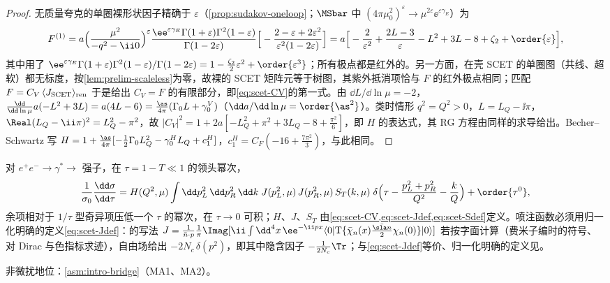 \begin{proof}
无质量夸克的单圈裸形状因子精确于 $\varepsilon$（\cref{prop:sudakov-oneloop}；$\MSbar$ 中 $(4\pi\mu_0^2)^\varepsilon\to\mu^{2\varepsilon}\ee^{\varepsilon\gamma_E}$）为
\[
F^{(1)}=a\Big(\frac{\mu^2}{-q^2-\ii0}\Big)^{\varepsilon}\frac{\ee^{\varepsilon\gamma_E}\Gamma(1+\varepsilon)\Gamma^2(1-\varepsilon)}{\Gamma(1-2\varepsilon)}\Big[-\frac{2-\varepsilon+2\varepsilon^2}{\varepsilon^2(1-2\varepsilon)}\Big]
=a\Big[-\frac{2}{\varepsilon^2}+\frac{2L-3}{\varepsilon}-L^2+3L-8+\zeta_2+\order{\varepsilon}\Big],
\]
其中用了 $\ee^{\varepsilon\gamma_E}\Gamma(1+\varepsilon)\Gamma^2(1-\varepsilon)/\Gamma(1-2\varepsilon)=1-\frac{\zeta_2}{2}\varepsilon^2+\order{\varepsilon^3}$；所有极点都是红外的。另一方面，在壳 SCET 的单圈图（共线、超软）都无标度，按\cref{lem:prelim-scaleless}为零，故裸的 SCET 矩阵元等于树图，其紫外抵消项恰与 $F$ 的红外极点相同；匹配 $F=C_V\,\langle J_{\rm SCET}\rangle_{\rm ren}$ 于是给出 $C_V=F$ 的有限部分，即\cref{eq:scet-CV}的第一式。由 $\dd L/\dd\ln\mu=-2$，$\frac{\dd}{\dd\ln\mu}a(-L^2+3L)=a(4L-6)=\frac{\as}{4\pi}(\Gamma_0L+\gamma^V_0)$（$\dd a/\dd\ln\mu=\order{\as^2}$）。类时情形 $q^2=Q^2>0$，$L=L_Q-\ii\pi$，$\Real(L_Q-\ii\pi)^2=L_Q^2-\pi^2$，故 $|C_V|^2=1+2a[-L_Q^2+\pi^2+3L_Q-8+\frac{\pi^2}{6}]$，即 $H$ 的表达式，其 RG 方程由同样的求导给出。Becher--Schwartz 写 $H=1+\frac{\as}{4\pi}[-\frac12\Gamma_0L_Q^2-\gamma^H_0L_Q+c^H_1]$，$c^H_1=C_F(-16+\frac{7\pi^2}{3})$，与此相同。
\end{proof}

\begin{theorem}\label{thm:scet-thrust}
对 $e^+e^-\to\gamma^*\to$ 强子，在 $\tau=1-T\ll1$ 的领头幂次，
\begin{equation}\label{eq:scet-thrust-fact}
\frac{1}{\sigma_0}\frac{\dd\sigma}{\dd\tau}=H(Q^2,\mu)\int\dd p_L^2\,\dd p_R^2\,\dd k\;J(p_L^2,\mu)\,J(p_R^2,\mu)\,S_T(k,\mu)\;
\delta\Big(\tau-\frac{p_L^2+p_R^2}{Q^2}-\frac kQ\Big)+\order{\tau^0},
\end{equation}
余项相对于 $1/\tau$ 型奇异项压低一个 $\tau$ 的幂次，在 $\tau\to0$ 可积；$H$、$J$、$S_T$ 由\cref{eq:scet-CV,eq:scet-Jdef,eq:scet-Sdef}定义。喷注函数必须用归一化明确的定义\cref{eq:scet-Jdef}：\cite[式~(2.6)]{BecherSchwartz2008}的写法 $J=\frac{1}{\bar n\cdot p}\frac1\pi\Imag[\ii\int\dd^4x\,\ee^{-\ii px}\langle0|\mathrm T\{\bar\chi_n(x)\frac{\bar{\sla n}}2\chi_n(0)\}|0\rangle]$ 若按字面计算（费米子编时的符号、对 Dirac 与色指标求迹），自由场给出 $-2N_c\,\delta(p^2)$，即其中隐含因子 $-\frac1{2N_c}\Tr$；与\cref{eq:scet-Jdef}等价、归一化明确的定义见\cite[式~(3)、(6)]{Becher:2006qw}。%
\par 非微扰地位：\cref{asm:intro-bridge}（MA1、MA2）。
\end{theorem}


